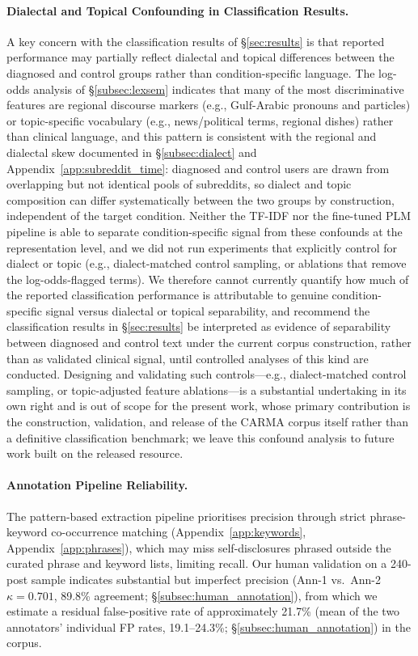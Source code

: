 \documentclass[11pt]{article}
\begin{document}
\paragraph{Dialectal and Topical Confounding in Classification Results.}
A key concern with the classification results of §\ref{sec:results} is that reported performance may partially reflect dialectal and topical differences between the diagnosed and control groups rather than condition-specific language. The log-odds analysis of §\ref{subsec:lexsem} indicates that many of the most discriminative features are regional discourse markers (e.g., Gulf-Arabic pronouns and particles) or topic-specific vocabulary (e.g., news/political terms, regional dishes) rather than clinical language, and this pattern is consistent with the regional and dialectal skew documented in §\ref{subsec:dialect} and Appendix~\ref{app:subreddit_time}: diagnosed and control users are drawn from overlapping but not identical pools of subreddits, so dialect and topic composition can differ systematically between the two groups by construction, independent of the target condition. Neither the TF-IDF nor the fine-tuned PLM pipeline is able to separate condition-specific signal from these confounds at the representation level, and we did not run experiments that explicitly control for dialect or topic (e.g., dialect-matched control sampling, or ablations that remove the log-odds-flagged terms). We therefore cannot currently quantify how much of the reported classification performance is attributable to genuine condition-specific signal versus dialectal or topical separability, and recommend the classification results in §\ref{sec:results} be interpreted as evidence of separability between diagnosed and control text under the current corpus construction, rather than as validated clinical signal, until controlled analyses of this kind are conducted. Designing and validating such controls---e.g., dialect-matched control sampling, or topic-adjusted feature ablations---is a substantial undertaking in its own right and is out of scope for the present work, whose primary contribution is the construction, validation, and release of the CARMA corpus itself rather than a definitive classification benchmark; we leave this confound analysis to future work built on the released resource.

\paragraph{Annotation Pipeline Reliability.}
The pattern-based extraction pipeline prioritises precision through strict phrase-keyword co-occurrence matching (Appendix~\ref{app:keywords}, Appendix~\ref{app:phrases}), which may miss self-disclosures phrased outside the curated phrase and keyword lists, limiting recall. Our human validation on a 240-post sample indicates substantial but imperfect precision (Ann-1 vs.\ Ann-2 $\kappa = 0.701$, 89.8\% agreement; §\ref{subsec:human_annotation}), from which we estimate a residual false-positive rate of approximately 21.7\% (mean of the two annotators' individual FP rates, 19.1--24.3\%; §\ref{subsec:human_annotation}) in the corpus.
\end{document}
